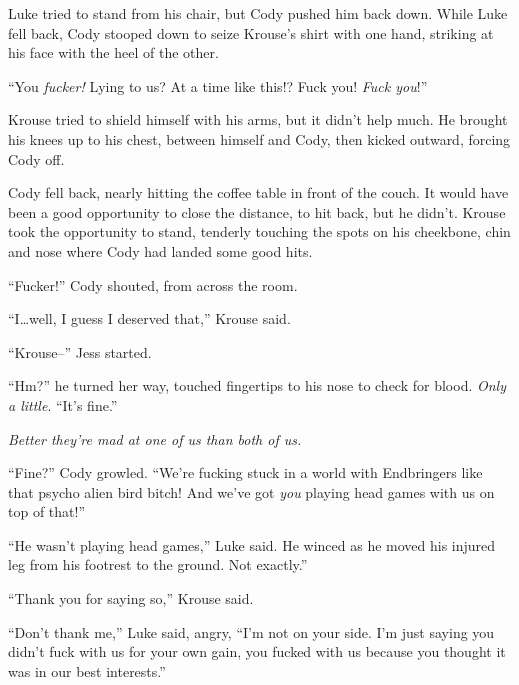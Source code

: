 Luke tried to stand from his chair, but Cody pushed him back down.  While Luke fell back, Cody stooped down to seize Krouse's shirt with one hand, striking at his face with the heel of the other.



``You \emph{fucker!  }Lying to us?  At a time like this!?  Fuck you!  \emph{Fuck you}!''



Krouse tried to shield himself with his arms, but it didn't help much.  He brought his knees up to his chest, between himself and Cody, then kicked outward, forcing Cody off.



Cody fell back, nearly hitting the coffee table in front of the couch.  It would have been a good opportunity to close the distance, to hit back, but he didn't.  Krouse took the opportunity to stand, tenderly touching the spots on his cheekbone, chin and nose where Cody had landed some good hits.



``Fucker!''  Cody shouted, from across the room.



``I\ldots well, I guess I deserved that,'' Krouse said.



``Krouse--'' Jess started.



``Hm?'' he turned her way, touched fingertips to his nose to check for blood.  \emph{Only a little}.  ``It's fine.''



\emph{Better they're mad at one of us than both of us.}



``Fine?'' Cody growled.  ``We're fucking stuck in a world with Endbringers like that psycho alien bird bitch!  And we've got \emph{you} playing head games with us on top of that!''



``He wasn't playing head games,'' Luke said.  He winced as he moved his injured leg from his footrest to the ground.  Not exactly.''



``Thank you for saying so,'' Krouse said.



``Don't thank me,'' Luke said, angry, ``I'm not on your side.  I'm just saying you didn't fuck with us for your own gain, you fucked with us because you thought it was in our best interests.''



